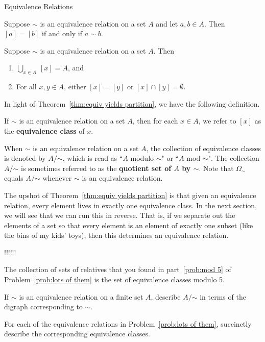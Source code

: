 \begin{section}{Equivalence Relations}
\begin{theorem}\label{thm:related if and only if same class}
Suppose $\sim$ is an equivalence relation on a set $A$ and let $a,b\in A$.  Then $[a]=[b]$ if and only if $a\sim b$.
\end{theorem}

\begin{theorem}\label{thm:equiv yields partition}
Suppose $\sim$ is an equivalence relation on a set $A$.  Then
\begin{enumerate}[label=\textrm{(\alph*)}]
\item $\displaystyle \bigcup_{x\in A}\ [x]=A$, and
\item For all $x,y\in A$, either $[x]=[y]$ or $[x]\cap [y]=\emptyset$.
\end{enumerate}
\end{theorem}

In light of Theorem~\ref{thm:equiv yields partition}, we have the following definition.

\begin{definition}\label{def:equivalence class}
If $\sim$ is an equivalence relation on a set $A$, then for each $x\in A$, we refer to $[x]$ as the \textbf{equivalence class} of $x$.
\end{definition}

When $\sim$ is an equivalence relation on a set $A$, the collection of equivalence classes is denoted by $A/\mathord\sim$, which is read as ``$A$ modulo $\sim$" or ``$A$ mod $\sim$".  The collection $A/\mathord\sim$ is sometimes referred to as the \textbf{quotient set of $A$ by $\sim$}. Note that $\Omega_{\sim}$ equals $A/\mathord\sim$ whenever $\sim$ is an equivalence relation.

The upshot of Theorem~\ref{thm:equiv yields partition} is that given an equivalence relation, every element lives in exactly one equivalence class.  In the next section, we will see that we can run this in reverse.  That is, if we separate out the elements of a set so that every element is an element of exactly one subset (like the bins of my kids' toys), then this determines an equivalence relation.


!!!!!!

\begin{example}
The collection of sets of relatives that you found in part~\ref{prob:mod 5} of Problem~\ref{prob:lots of them} is the set of equivalence classes modulo 5.
\end{example}

\begin{problem}
If $\sim$ is an equivalence relation on a finite set $A$, describe $A/\mathord\sim$ in terms of the digraph corresponding to $\sim$.
\end{problem}

\begin{problem}
For each of the equivalence relations in Problem~\ref{prob:lots of them}, succinctly describe the corresponding equivalence classes.
\end{problem}

\end{section}